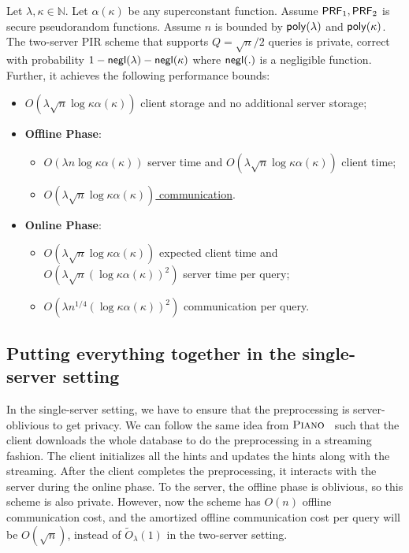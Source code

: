 \begin{theorem}
    Let $\lambda,\kappa\in \mathbb{N}$.
    Let $\alpha(\kappa)$ be any superconstant function. Assume $\mathsf{PRF}_1,\mathsf{PRF}_2$ is secure pseudorandom functions. Assume $n$ is bounded by $\mathsf{poly}(\lambda)$ and
    $\mathsf{poly}(\kappa)$. The two-server PIR scheme that supports $Q=\sqrt{n}/2$ queries is private, correct with probability
    $1-\mathsf{negl}(\lambda)-\mathsf{negl}(\kappa)$ where $\mathsf{negl}(.)$ is a negligible function. Further, it achieves the following performance
    bounds:
    
    
    \begin{itemize}
        \item $O(\lambda\sqrt{n}\log \kappa \alpha(\kappa))$ client storage and
        no additional server storage;
        \item \textbf{Offline Phase}:
        \begin{itemize}
            \item $O(\lambda n\log \kappa \alpha(\kappa))$ server time and
            $O(\lambda\sqrt{n}\log \kappa \alpha(\kappa))$ client time;
            \item \underline{$O(\lambda\sqrt{n}\log \kappa \alpha(\kappa))$
                communication}.
        \end{itemize}
        \item \textbf{Online Phase}:
        \begin{itemize}
            \item $O(\lambda\sqrt{n}\log \kappa \alpha(\kappa))$ expected client
            time and $O(\lambda\sqrt{n}(\log \kappa \alpha(\kappa))^2)$ server
            time per query; 
            \item $O(\lambda n^{1/4}(\log \kappa    \alpha(\kappa))^2)$
            communication per query.
        \end{itemize}
    \end{itemize}     
\end{theorem}

\subsection{Putting everything together in the single-server setting}

\label{sec:single-server}

In the single-server setting, we have to ensure that the preprocessing is server-oblivious to get privacy.
We can follow the same idea from $\textsc{Piano}$~\cite{piano} such that the client downloads the whole database to do the preprocessing in a streaming fashion. 
    The client initializes all the hints and updates the hints along with the streaming.
    After the client completes the preprocessing, it interacts with the server during the online phase.
    To the server, the offline phase is oblivious, so this scheme is also private. 
    However, now the scheme has $O(n)$ offline communication cost, and the amortized offline communication cost per query will be $O(\sqrt{n})$, instead of $\widetilde{O}_\lambda(1)$ in the two-server setting.

